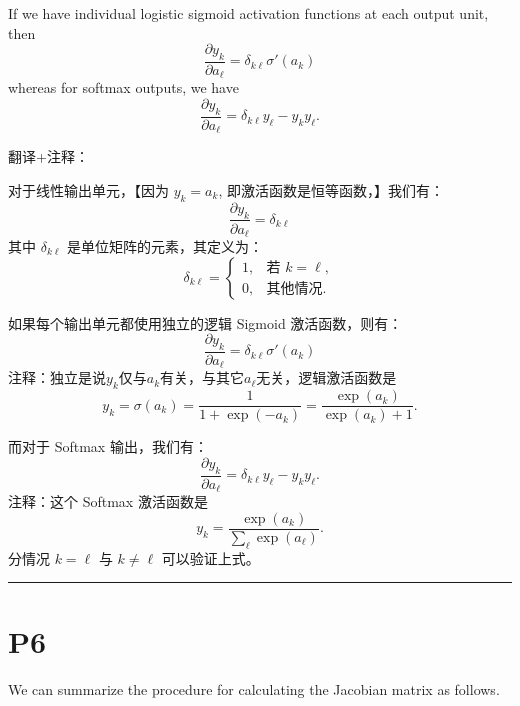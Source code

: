 \documentclass{article}
\begin{document}
If we have individual logistic sigmoid activation functions at each output unit, then
\begin{equation}
    \frac{\partial y_k}{\partial a_\ell} = \delta_{k\ell} \sigma'(a_k)
    \tag{8.33}
\end{equation}
whereas for softmax outputs, we have
\begin{equation}
    \frac{\partial y_k}{\partial a_\ell} = \delta_{k\ell} y_\ell - y_k y_\ell.
    \tag{8.34}
\end{equation}

{\color{red}
翻译+注释：

对于线性输出单元，【因为 $y_k=a_k$, 即激活函数是恒等函数，】我们有：
\begin{equation}
    \frac{\partial y_k}{\partial a_\ell} = \delta_{k\ell}
    \tag{8.31}
\end{equation}
其中 $\delta_{k\ell}$ 是单位矩阵的元素，其定义为：
\begin{equation}
    \delta_{k\ell} =
    \begin{cases}
        1, & \text{若 } k = \ell, \\
        0, & \text{其他情况}.
    \end{cases}
    \tag{8.32}
\end{equation}

如果每个输出单元都使用独立的逻辑 Sigmoid 激活函数，则有：
\begin{equation}
    \frac{\partial y_k}{\partial a_\ell} = \delta_{k\ell} \sigma'(a_k)
    \tag{8.33}
\end{equation}
注释：独立是说$y_k$仅与$a_k$有关，与其它$a_{\ell}$无关，逻辑激活函数是 
$$
y_k=\sigma(a_k)=\frac{1}{1+\exp(-a_k)}=\frac{\exp(a_k)}{\exp(a_k)+1}.
$$

而对于 Softmax 输出，我们有：
\begin{equation}
    \frac{\partial y_k}{\partial a_\ell} = \delta_{k\ell} y_\ell - y_k y_\ell.
    \tag{8.34}
\end{equation}
注释：这个 Softmax 激活函数是
$$
y_k = \frac{\exp(a_k)}{\sum\limits_\ell\exp(a_\ell)}.
$$
分情况 $k=\ell$ 与 $k\neq \ell$ 可以验证上式。

}

\noindent\rule{\linewidth}{0.4pt}

\section{P6}

We can summarize the procedure for calculating the Jacobian matrix as follows. 
\end{document}
